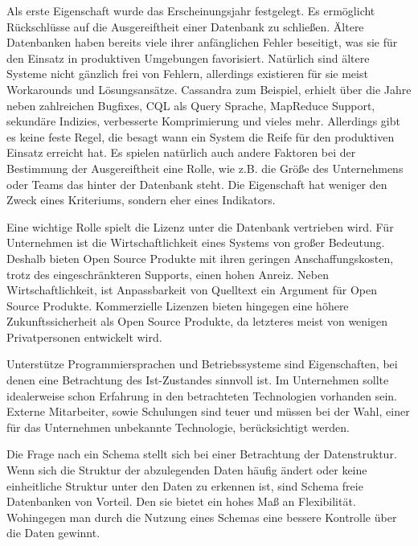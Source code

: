 Als erste Eigenschaft wurde das Erscheinungsjahr festgelegt. Es ermöglicht Rückschlüsse auf die Ausgereiftheit einer Datenbank zu schließen. Ältere Datenbanken haben bereits viele ihrer anfänglichen Fehler beseitigt, was sie für den Einsatz in produktiven Umgebungen favorisiert. Natürlich sind ältere Systeme nicht gänzlich frei von Fehlern, allerdings existieren für sie meist Workarounds und Lösungsansätze. Cassandra zum Beispiel, erhielt über die Jahre neben zahlreichen Bugfixes, CQL als Query Sprache, MapReduce Support, sekundäre Indizies, verbesserte Komprimierung und vieles mehr. Allerdings gibt es keine feste Regel, die besagt wann ein System die Reife für den produktiven Einsatz erreicht hat. Es spielen natürlich auch andere Faktoren bei der Bestimmung der Ausgereiftheit eine Rolle, wie z.B. die Größe des Unternehmens oder Teams das hinter der Datenbank steht. Die Eigenschaft hat weniger den Zweck eines Kriteriums, sondern eher eines Indikators. 

Eine wichtige Rolle spielt die Lizenz unter die Datenbank vertrieben wird. Für Unternehmen ist die Wirtschaftlichkeit eines Systems von großer Bedeutung. Deshalb bieten Open Source Produkte mit ihren geringen Anschaffungskosten, trotz des eingeschränkteren Supports, einen hohen Anreiz. Neben Wirtschaftlichkeit, ist Anpassbarkeit von Quelltext ein Argument für Open Source Produkte. 
Kommerzielle Lizenzen bieten hingegen eine höhere Zukunftssicherheit als Open Source Produkte, da letzteres meist von wenigen Privatpersonen entwickelt wird.

Unterstütze Programmiersprachen und Betriebssysteme sind Eigenschaften, bei denen eine Betrachtung des Ist-Zustandes sinnvoll ist. Im Unternehmen sollte idealerweise schon Erfahrung in den betrachteten Technologien vorhanden sein. Externe Mitarbeiter, sowie Schulungen sind teuer und müssen bei der Wahl, einer für das Unternehmen unbekannte Technologie, berücksichtigt werden. 

Die Frage nach ein Schema stellt sich bei einer Betrachtung der Datenstruktur. Wenn sich die Struktur der abzulegenden Daten häufig ändert oder keine einheitliche Struktur unter den Daten zu erkennen ist, sind Schema freie Datenbanken von Vorteil. Den sie bietet ein hohes Maß an Flexibilität. Wohingegen man durch die Nutzung eines Schemas eine bessere Kontrolle über die Daten gewinnt.  


